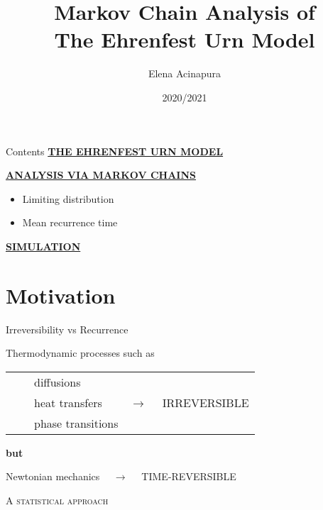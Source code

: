 \documentclass[usenames,dvipsnames]{beamer}
\title{Markov Chain Analysis of \\The Ehrenfest Urn Model}
\date{2020/2021}
\author{Elena Acinapura}
\institute{Università di Trento}
\newcommand{\tabitem}{~~\llap{\textbullet}~~}
\begin{document}
  \maketitle

  \begin{frame}{Contents}
    \hyperlink{model}{\MakeUppercase{\textbf{The Ehrenfest urn model}}}

    \bigskip
    \hyperlink{markov}{\MakeUppercase{\textbf{Analysis via Markov chains}}}
      \begin{itemize}
        \item Limiting distribution
        \item Mean recurrence time
      \end{itemize}
      \bigskip
    \hyperlink{simulation}{\MakeUppercase{\textbf{Simulation}}}
  \end{frame}

  \section{Motivation}
  \begin{frame}{Irreversibility vs Recurrence}
    \begin{center}
      Thermodynamic processes such as
    \end{center}
    \begin{table}
        \begin{center}
        \begin{tabular}{l c}
            \tabitem diffusions & \\
            \tabitem heat transfers & $\rightarrow \quad $ \alert{\MakeUppercase{irreversible}}\\
            \tabitem phase transitions & 
        \end{tabular}
        \end{center}
    \end{table}
    
    \begin{center}
        \textbf{but}
    \end{center}
    
    \begin{center}
    Newtonian mechanics $\quad \rightarrow \quad$ \alert{\MakeUppercase{time-reversible}}
    \end{center}
  \end{frame}

  \begin{frame}[standout]
    \textsc{A statistical approach}
  \end{frame}
  
\end{document}

